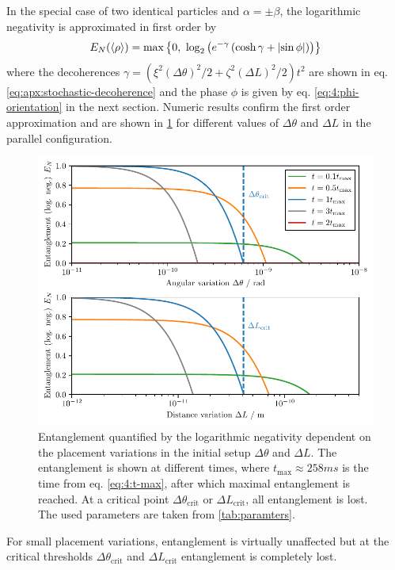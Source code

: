In the special case of two identical particles and $\alpha=\pm\beta$, the logarithmic negativity is approximated in first order by
\begin{equation}\label{eq:4:log-neg-analytical}
  E_N(\mean{\rho}) = \max\left\{ 0,\ \log_2\left(e^{-\gamma}\left(\cosh\gamma + \abs{\sin \phi}\right)\right) \right\}
\end{equation}
where the decoherences $\gamma = \left(\xi^2(\Delta \theta)^2/2 + \zeta^2(\Delta L)^2/2\right)t^2$ are shown in eq. \eqref{eq:apx:stochastic-decoherence} and the phase $\phi$ is given by eq. \eqref{eq:4:phi-orientation} in the next section.
Numeric results confirm the first order approximation and are shown in \cref{fig:4:EN-variations} for different values of $\Delta \theta$ and $\Delta L$ in the parallel configuration.
\begin{figure}[!htb]
  \centering
  \includegraphics[width=\textwidth]{./../figures/theta-variance/EN-deltaTheta-deltaL.pdf}
  \caption{Entanglement quantified by the logarithmic negativity dependent on the placement variations in the initial setup $\Delta \theta$ and $\Delta L$. The entanglement is shown at different times, where $t_\mathrm{max} \approx 258\si{ms}$ is the time from eq. \eqref{eq:4:t-max}, after which maximal entanglement is reached. At a critical point $\Delta \theta_\mathrm{crit}$ or $\Delta L_\mathrm{crit}$, all entanglement is lost. The used parameters are taken from \cref{tab:paramters}.}
  \label{fig:4:EN-variations}
\end{figure}
For small placement variations, entanglement is virtually unaffected but at the critical thresholds $\Delta \theta_\mathrm{crit}$ and $\Delta L_\mathrm{crit}$ entanglement is completely lost.
